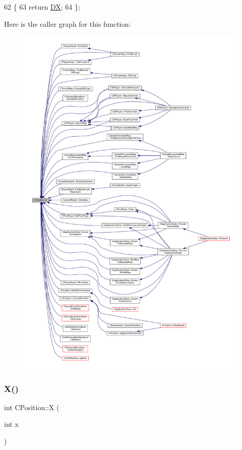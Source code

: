 \begin{DoxyCode}
62                      \{
63             \textcolor{keywordflow}{return} \hyperlink{classCPosition_a28445f9b872169715919074d82044eda}{DX};  
64         \};
\end{DoxyCode}
Here is the caller graph for this function\+:
\nopagebreak
\begin{figure}[H]
\begin{center}
\leavevmode
\includegraphics[width=350pt]{classCPosition_a9a6b94d3b91df1492d166d9964c865fc_icgraph}
\end{center}
\end{figure}
\hypertarget{classCPosition_abcbbd0f2a24118ff32560150c967b1da}{}\label{classCPosition_abcbbd0f2a24118ff32560150c967b1da} 
\subsubsection{\texorpdfstring{X()}{X()}\hspace{0.1cm}{\footnotesize\ttfamily [2/2]}}
{\footnotesize\ttfamily int C\+Position\+::X (\begin{DoxyParamCaption}\item[{int}]{x }\end{DoxyParamCaption})\hspace{0.3cm}{\ttfamily [inline]}}



